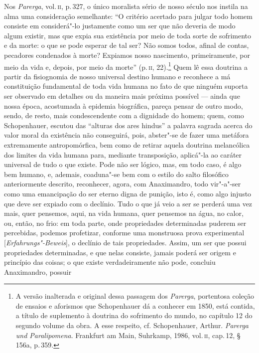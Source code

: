 Nos \textit{Parerga}, vol.\,\textsc{ii}, p.\,327, o único moralista sério de
nosso século nos instila na alma uma consideração semelhante: ``O critério
acertado para julgar todo homem consiste em considerá"-lo justamente como um
ser que não deveria de modo algum existir, mas que expia sua existência por
meio de toda sorte de sofrimento e da morte: o que se pode esperar de tal
ser? Não somos todos, afinal de contas, pecadores condenados à morte?
Expiamos nosso nascimento, primeiramente, por meio da vida e, depois, por
meio da morte'' (p.\,\textsc{ii}, 22).\footnote{A versão inalterada e
original dessa passagem dos \textit{Parerga}, portentosa coleção de ensaios e
aforismos que Schopenhauer dá a conhecer em 1850, está contida, a título de
suplemento à doutrina do sofrimento do mundo, no capítulo 12 do segundo
volume da obra. A esse respeito, cf. Schopenhauer, Arthur. \textit{Parerga 
und Paralipomena}. Frankfurt am Main, Suhrkamp, 1986, vol.\,\textsc
{ii}, cap.\,12,  § 156a, p.\,359.} Quem lê essa doutrina a partir da
fisiognomia de nosso universal destino humano e reconhece a má constituição
fundamental de toda vida humana no fato de que ninguém suporta ser observado
em detalhes ou da maneira mais próxima possível --- ainda que nossa época,
acostumada à epidemia biográfica, pareça pensar de outro modo, sendo, de
resto, mais condescendente com a dignidade do homem; quem, como Schopenhauer,
escutou das ``alturas dos ares hindus'' a palavra sagrada acerca do valor
moral da existência não conseguirá, pois, abster"-se de fazer uma metáfora
extremamente antropomórfica, bem como de retirar aquela doutrina melancólica
dos limites da vida humana para, mediante transposição, aplicá"-la ao caráter
universal de tudo o que existe. Pode não ser lógico, mas, em todo caso, é
algo bem humano, e, ademais, coaduna"-se bem com o estilo do salto filosófico
anteriormente descrito, reconhecer, agora, com Anaximandro, todo vir"-a"-ser
como uma emancipação \label{sereterno} do ser eterno digna de punição, isto
é, como algo injusto que deve ser expiado com o declínio. Tudo o que já veio
a ser se perderá uma vez mais, quer pensemos, aqui, na vida humana, quer
pensemos na água, no calor, ou, então, no frio: em toda parte, onde
propriedades determinadas puderem ser percebidas, podemos profetizar,
conforme uma monstruosa prova experimental [\textit{Erfahrungs"-Beweis}], o
declínio de tais propriedades. Assim, um ser que possui propriedades
determinadas, e que nelas consiste, jamais poderá ser origem e princípio das
coisas; o que existe verdadeiramente não pode, concluiu Anaximandro, possuir
